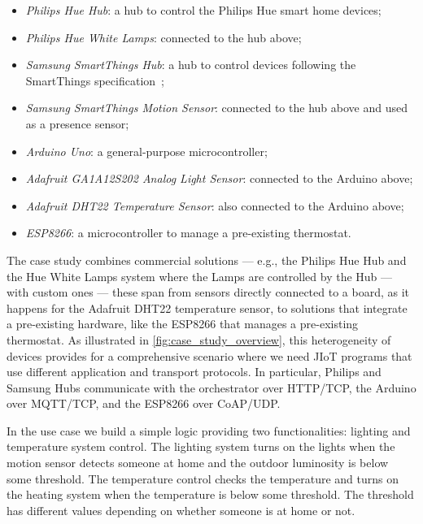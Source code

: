 \begin{itemize} 

\item \emph{Philips Hue Hub}: a hub to control the Philips Hue smart home
devices;

\item \emph{Philips Hue White Lamps}: connected to the hub above; \item
\emph{Samsung SmartThings Hub}: a hub to control devices following  the
SmartThings specification~\cite{60};

\item \emph{Samsung SmartThings Motion Sensor}: connected to the hub above and
used as a presence sensor;

\item \emph{Arduino Uno}: a general-purpose microcontroller;

\item \emph{Adafruit GA1A12S202 Analog Light Sensor}: connected to the Arduino
above;

\item \emph{Adafruit DHT22 Temperature Sensor}: also connected to the Arduino
above;

\item \emph{ESP8266}: a microcontroller to manage a pre-existing  thermostat.

\end{itemize}

The case study combines commercial solutions --- e.g., the Philips Hue Hub and
the Hue White Lamps system where the Lamps are controlled by the Hub --- with
custom ones --- these span from sensors directly connected to a board, as it
happens for the Adafruit DHT22 temperature sensor, to solutions that integrate
a pre-existing hardware, like the ESP8266 that manages a pre-existing
thermostat. As illustrated in \cref{fig:case_study_overview}, this
heterogeneity of devices provides for a comprehensive scenario where we need
JIoT programs that use different application and transport protocols. In
particular, Philips and Samsung Hubs communicate with the orchestrator over
HTTP/TCP, the Arduino over MQTT/TCP, and the ESP8266 over CoAP/UDP.

In the use case we build a simple logic providing two functionalities: lighting
and temperature system control. The lighting system turns on the lights when
the motion sensor detects someone at home and the outdoor luminosity is below
some threshold. The temperature control checks the temperature and turns on the
heating system when the temperature is below some threshold. The threshold has
different values depending on whether someone is at home or not.

